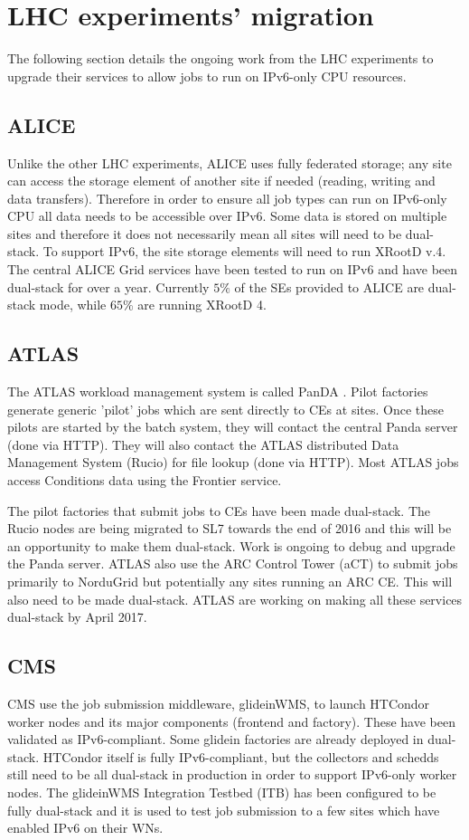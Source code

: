 \documentclass[a4paper]{jpconf}
\begin{document}
\section{LHC experiments' migration}
The following section details the ongoing work from the LHC experiments to
upgrade their services to allow jobs to run on IPv6-only CPU resources.

\subsection{ALICE}
Unlike the other LHC experiments, ALICE uses fully federated storage; any site
can access the storage element of another site if needed (reading,
writing and data transfers). Therefore in order to ensure all job
types can run on IPv6-only CPU all data needs to be accessible over
IPv6. Some data is stored on multiple sites and therefore it does not
necessarily mean all sites will need to be dual-stack. To support
IPv6, the site storage elements will need to run XRootD v.4. The central
ALICE Grid services have been tested to run on IPv6 and have been dual-stack for over a year. 
Currently $5\%$ of the SEs provided to ALICE are dual-stack mode, while $65\%$ are running XRootD 4.

\subsection{ATLAS}
The ATLAS workload management system is called PanDA \cite{Panda}.
Pilot factories generate generic 'pilot' jobs which are sent directly to CEs at
sites. Once these pilots are started by the batch system, they will
contact the central Panda server  (done via HTTP). They
will also contact the ATLAS distributed Data Management System (Rucio\cite{Rucio}) for file lookup (done via HTTP). 
Most ATLAS jobs access Conditions data using the Frontier service.

The pilot factories that submit jobs to CEs have been made dual-stack.  The Rucio nodes are being migrated to SL7 towards 
the end of 2016 and this will be an opportunity to make them dual-stack.  Work is ongoing to debug and upgrade the Panda server. ATLAS also use the ARC Control Tower (aCT) to submit jobs primarily to NorduGrid but potentially any sites running an ARC CE. This will also
need to be made dual-stack. ATLAS are working on making all these
services dual-stack by April 2017.

\subsection{CMS}
CMS use the job submission middleware, glideinWMS, to launch HTCondor
worker nodes and its major components (frontend and factory). These
have been validated as IPv6-compliant. Some glidein factories are
already deployed in dual-stack. HTCondor itself is fully
IPv6-compliant, but the collectors and schedds still need to be all
dual-stack in production in order to support IPv6-only worker nodes.
The glideinWMS Integration Testbed (ITB) has been configured to be fully
dual-stack and it is used to test job submission to a few sites which
have enabled IPv6 on their WNs.
\end{document}
